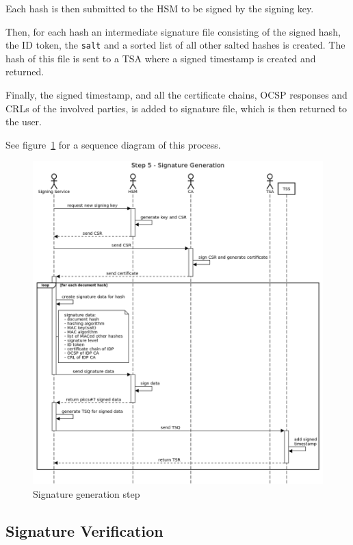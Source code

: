 Each hash is then submitted to the \gls{HSM} to be signed by the signing key.

Then, for each hash an intermediate signature file consisting of the signed hash,
the ID token, the \texttt{salt} and a sorted list of all other salted hashes is created.
The hash of this file is sent to a \gls{TSA} where a signed timestamp is created and returned.

Finally, the signed timestamp, and all the certificate chains,
\gls{OCSP} responses and \gls{CRL}s of the involved parties,
is added to signature file, which is then returned to the user.

See figure~\ref{fig:signaturegenerationstep} for a sequence diagram of this process.

\begin{figure}
	\begin{center}
		\includegraphics[scale=0.45]{images/protocol_step5_signature_generation.png}
		\caption{Signature generation step}
		\label{fig:signaturegenerationstep}
	\end{center}
\end{figure}

\subsection{Signature Verification}\label{subsec:signature-verification}

